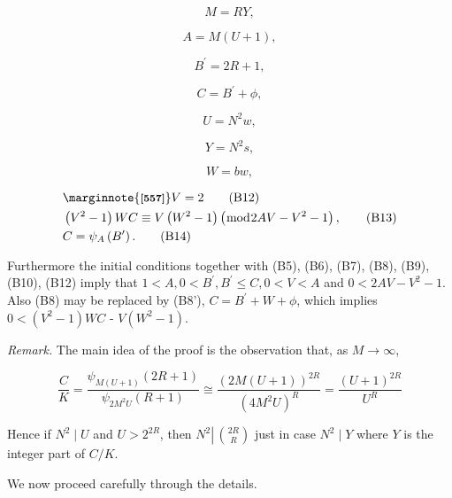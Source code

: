 \documentclass[11pt,a4paper]{article}
\newcommand{\origpage}[1]{\marginnote{\footnotesize\textbf{[#1]}}}
\begin{document}
\begin{equation*}
M=R Y, \tag{B5}
\end{equation*}

\begin{equation*}
A=M(U+1), \tag{B6}
\end{equation*}

\begin{equation*}
B^{\prime}=2 R+1, \tag{B7}
\end{equation*}

\begin{equation*}
C=B^{\prime}+\phi, \tag{B8}
\end{equation*}

\begin{equation*}
U=N^{2}w, \tag{B9}
\end{equation*}

\begin{equation*}
Y=N^{2}s, \tag{B10}
\end{equation*}

\begin{equation*}
W=bw, \tag{B11}
\end{equation*}

\begin{align*}
& \origpage{557} V=2  \tag{B12}\\
& \left(V^{2}-1\right) W C \equiv V\left(W^{2}-1\right)\left(\bmod 2 A V-V^{2}-1\right),  \tag{B13}\\
& C=\psi_{A}\left(B^{\prime}\right) . \tag{B14}
\end{align*}


Furthermore the initial conditions together with (B5), (B6), (B7), (B8), (B9), (B10), (B12) imply that $1<A,\allowbreak  0<B^{\prime},\allowbreak  B^{\prime} \leq C,\allowbreak  0<V<A$ and $0<2 A V-V^{2}-1$. Also (B8) may be replaced by (B8'), $C=B^{\prime}+W+\phi$, which implies $0<\left(V^{2}-1\right) W C$ - $V\left(W^{2}-1\right)$.

\noindent\emph{Remark.} The main idea of the proof is the observation that, as $M \rightarrow \infty$,

\[
\frac{C}{K}=\frac{\psi_{M(U+1)}(2R+1)}{\psi_{2M^{2}U}(R+1)} \cong \frac{(2 M(U+1))^{2 R}}{\left(4 M^{2} U\right)^{R}}=\frac{(U+1)^{2 R}}{U^{R}}
\]

Hence if $N^{2} \mid U$ and $U>2^{2 R}$, then $N^{2} \left\lvert\,\allowbreak \binom{ 2 R}{R}\right.$ just in case $N^{2} \mid Y$ where $Y$ is the integer part of $C / K$.

We now proceed carefully through the details.
\end{document}
